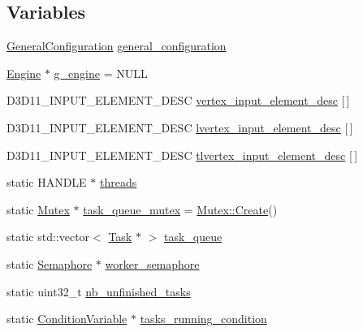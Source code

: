 \subsection*{Variables}
\begin{DoxyCompactItemize}
\item 
\hyperlink{structmage_1_1_general_configuration}{General\+Configuration} \hyperlink{namespacemage_a1f4290d574030d412ca0f2f51b1a2057}{general\+\_\+configuration}
\item 
\hyperlink{classmage_1_1_engine}{Engine} $\ast$ \hyperlink{namespacemage_a84bf83f1e8779d884452cdf08f56c19a}{g\+\_\+engine} = N\+U\+LL
\item 
D3\+D11\+\_\+\+I\+N\+P\+U\+T\+\_\+\+E\+L\+E\+M\+E\+N\+T\+\_\+\+D\+E\+SC \hyperlink{namespacemage_af852db837cfb700d168b6786abf62723}{vertex\+\_\+input\+\_\+element\+\_\+desc} \mbox{[}$\,$\mbox{]}
\item 
D3\+D11\+\_\+\+I\+N\+P\+U\+T\+\_\+\+E\+L\+E\+M\+E\+N\+T\+\_\+\+D\+E\+SC \hyperlink{namespacemage_a1a0bf329bff9193febe0c16632c62d1b}{lvertex\+\_\+input\+\_\+element\+\_\+desc} \mbox{[}$\,$\mbox{]}
\item 
D3\+D11\+\_\+\+I\+N\+P\+U\+T\+\_\+\+E\+L\+E\+M\+E\+N\+T\+\_\+\+D\+E\+SC \hyperlink{namespacemage_a53479d051c51213305d6ea7bcba7a5e8}{tlvertex\+\_\+input\+\_\+element\+\_\+desc} \mbox{[}$\,$\mbox{]}
\item 
static H\+A\+N\+D\+LE $\ast$ \hyperlink{namespacemage_a15e9f7d36194ec1b768a82a2294cce6c}{threads}
\item 
static \hyperlink{classmage_1_1_mutex}{Mutex} $\ast$ \hyperlink{namespacemage_a7de4544ddddcf8e0d54dbfdc0778f13f}{task\+\_\+queue\+\_\+mutex} = \hyperlink{classmage_1_1_mutex_a48d784fa6bffd4088d9f89a2a9cca84e}{Mutex\+::\+Create}()
\item 
static std\+::vector$<$ \hyperlink{classmage_1_1_task}{Task} $\ast$ $>$ \hyperlink{namespacemage_adc0172060af06a43cdcc54a5bb2b046c}{task\+\_\+queue}
\item 
static \hyperlink{classmage_1_1_semaphore}{Semaphore} $\ast$ \hyperlink{namespacemage_a17c3448f9fba7521d188d30bdfb77e33}{worker\+\_\+semaphore}
\item 
static uint32\+\_\+t \hyperlink{namespacemage_a390e8652d67667609daf3aa64e3c00a8}{nb\+\_\+unfinished\+\_\+tasks}
\item 
static \hyperlink{classmage_1_1_condition_variable}{Condition\+Variable} $\ast$ \hyperlink{namespacemage_a8c04b4285ebbc0fb416b1905c01cf149}{tasks\+\_\+running\+\_\+condition}
\end{DoxyCompactItemize}



